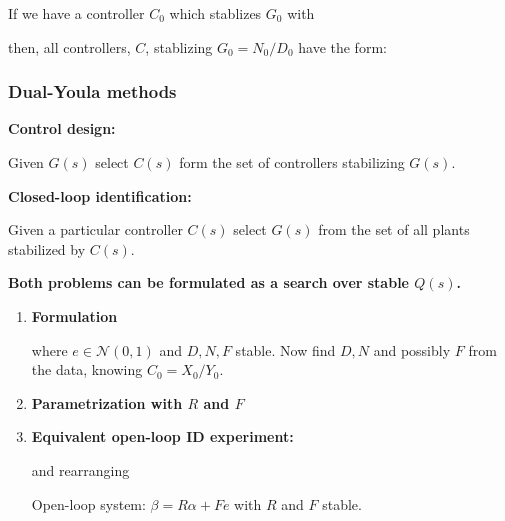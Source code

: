 \documentclass[10pt,a4paper]{scrartcl}
\begin{document}
\begin{multicols*}{2}
If we have a controller $C_0$ which stablizes $G_0$ with


then, all controllers, $C$, stablizing $G_0=N_0/D_0$ have the form:


\subsubsection{Dual-Youla methods}

\textbf{Control design:}

Given $G(s)$ select $C(s)$ form the set of controllers stabilizing $G(s)$.

\textbf{Closed-loop identification:}

Given a particular controller $C(s)$ select $G(s)$ from the set of all plants stabilized by $C(s)$.

\textbf{Both problems can be formulated as a search over stable $Q(s)$.}

\vspace{3ex}

\begin{enumerate}
\item \textbf{Formulation}


where $e\in\mathcal{N}(0,1)$ and $D,N,F$ stable. Now find $D,N$ and possibly $F$ from the data, knowing $C_0=X_0/Y_0$.

\item \textbf{Parametrization with $R$ and $F$}


\item \textbf{Equivalent open-loop ID experiment:}


and rearranging


Open-loop system: $\beta = R\alpha + Fe$ with $R$ and $F$ stable.
\end{enumerate}



\end{multicols*}
\end{document}
